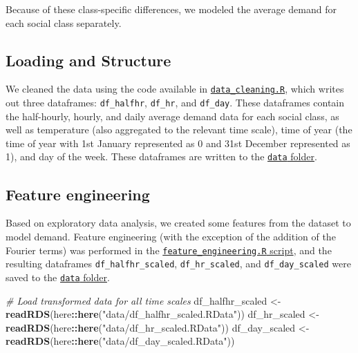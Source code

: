 \documentclass[
]{article}
\newenvironment{Shaded}{\begin{snugshade}}{\end{snugshade}}
\newcommand{\CommentTok}[1]{\textcolor[rgb]{0.56,0.35,0.01}{\textit{#1}}}
\newcommand{\FunctionTok}[1]{\textcolor[rgb]{0.13,0.29,0.53}{\textbf{#1}}}
\newcommand{\NormalTok}[1]{#1}
\newcommand{\OtherTok}[1]{\textcolor[rgb]{0.56,0.35,0.01}{#1}}
\newcommand{\SpecialCharTok}[1]{\textcolor[rgb]{0.81,0.36,0.00}{\textbf{#1}}}
\newcommand{\StringTok}[1]{\textcolor[rgb]{0.31,0.60,0.02}{#1}}
\begin{document}
Because of these class-specific differences, we modeled the average
demand for each social class separately.

\hypertarget{loading-and-structure}{%
\subsection{Loading and Structure}\label{loading-and-structure}}

We cleaned the data using the code available in
\href{https://github.com/Shermjj/SC-2-Electric-Boogalo/blob/main/data_cleaning.R}{\texttt{data\_cleaning.R}},
which writes out three dataframes: \texttt{df\_halfhr}, \texttt{df\_hr},
and \texttt{df\_day}. These dataframes contain the half-hourly, hourly,
and daily average demand data for each social class, as well as
temperature (also aggregated to the relevant time scale), time of year
(the time of year with 1st January represented as 0 and 31st December
represented as 1), and day of the week. These dataframes are written to
the
\href{https://github.com/Shermjj/SC-2-Electric-Boogalo/tree/main/data}{\texttt{data}
folder}.

\hypertarget{feature-engineering}{%
\subsection{Feature engineering}\label{feature-engineering}}

Based on exploratory data analysis, we created some features from the
dataset to model demand. Feature engineering (with the exception of the
addition of the Fourier terms) was performed in the
\href{https://github.com/Shermjj/SC-2-Electric-Boogalo/blob/main/feature_engineering.R}{\texttt{feature\_engineering.R}
script}, and the resulting dataframes \texttt{df\_halfhr\_scaled},
\texttt{df\_hr\_scaled}, and \texttt{df\_day\_scaled} were saved to the
\href{https://github.com/Shermjj/SC-2-Electric-Boogalo/tree/main/data}{\texttt{data}
folder}.

\begin{Shaded}
\begin{Highlighting}[]
\CommentTok{\# Load transformed data for all time scales}
\NormalTok{df\_halfhr\_scaled }\OtherTok{\textless{}{-}} \FunctionTok{readRDS}\NormalTok{(here}\SpecialCharTok{::}\FunctionTok{here}\NormalTok{(}\StringTok{"data/df\_halfhr\_scaled.RData"}\NormalTok{))}
\NormalTok{df\_hr\_scaled }\OtherTok{\textless{}{-}} \FunctionTok{readRDS}\NormalTok{(here}\SpecialCharTok{::}\FunctionTok{here}\NormalTok{(}\StringTok{"data/df\_hr\_scaled.RData"}\NormalTok{))}
\NormalTok{df\_day\_scaled }\OtherTok{\textless{}{-}} \FunctionTok{readRDS}\NormalTok{(here}\SpecialCharTok{::}\FunctionTok{here}\NormalTok{(}\StringTok{"data/df\_day\_scaled.RData"}\NormalTok{))}
\end{Highlighting}
\end{Shaded}
\end{document}
